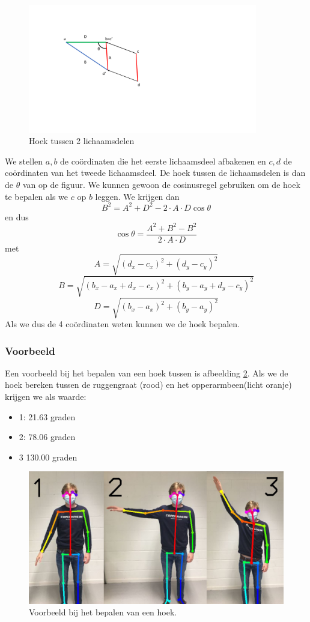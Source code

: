 \documentclass{article}
\begin{document}
\begin{figure}
	\begin{center}
		\includegraphics[width=10cm]{cos.pdf}
	\end{center}
	\caption{Hoek tussen 2 lichaamsdelen}
	\label{cos}
\end{figure}

We stellen \(a, b\) de coördinaten die het eerste lichaamsdeel afbakenen en \(c, d\) de coördinaten van het tweede lichaamsdeel. De hoek tussen de lichaamsdelen is dan de \(\theta\) van op de figuur. We kunnen gewoon de cosinusregel gebruiken om de hoek te bepalen als we \(c\) op \(b\) leggen. We krijgen dan
\[B^2 = A^2 + D^2 -2\cdot A\cdot D\cos\theta\]
en dus
\[\cos\theta = \frac{A^2 + B^2 - B^2}{2\cdot A\cdot D}\]
met
\[A = \sqrt{(d_x - c_x)^2 + (d_y - c_y)^2}\]
\[B = \sqrt{(b_x - a_x + d_x - c_x)^2 + (b_y - a_y + d_y - c_y)^2}\]
\[D = \sqrt{(b_x - a_x)^2 + (b_y - a_y)^2}\]
Als we dus de 4 coördinaten weten kunnen we de hoek bepalen.
\subsubsection{Voorbeeld}
Een voorbeeld bij het bepalen van een hoek tussen is afbeelding \ref{samen}. Als we de hoek bereken tussen de ruggengraat (rood) en het opperarmbeen(licht oranje) krijgen we als waarde:
\begin{itemize}
	\item 1: 21.63 graden
	\item 2: 78.06 graden
	\item 3 130.00 graden
\end{itemize}
\begin{figure}
	\begin{center}
		\includegraphics[width=12cm]{samen.jpg}
	\end{center}
	\caption{Voorbeeld bij het bepalen van een hoek.}
	\label{samen}
\end{figure}
\end{document}
